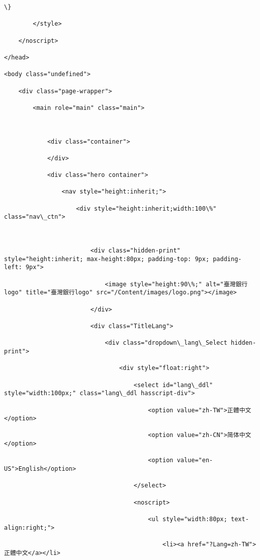 \documentclass[11pt]{article}
\begin{document}
\begin{Verbatim}[commandchars=\\\{\}]
            \}

        </style>

    </noscript>

</head>

<body class="undefined">

    <div class="page-wrapper">

        <main role="main" class="main">



            <div class="container">

            </div>

            <div class="hero container">

                <nav style="height:inherit;">

                    <div style="height:inherit;width:100\%" class="nav\_ctn">

                        

                        <div class="hidden-print" style="height:inherit; max-height:80px; padding-top: 9px; padding-left: 9px">

                            <image style="height:90\%;" alt="臺灣銀行logo" title="臺灣銀行logo" src="/Content/images/logo.png"></image>

                        </div>

                        <div class="TitleLang">

                            <div class="dropdown\_lang\_Select hidden-print">

                                <div style="float:right">

                                    <select id="lang\_ddl" style="width:100px;" class="lang\_ddl hasscript-div">

                                        <option value="zh-TW">正體中文</option>

                                        <option value="zh-CN">简体中文</option>

                                        <option value="en-US">English</option>

                                    </select>

                                    <noscript>

                                        <ul style="width:80px; text-align:right;">

                                            <li><a href="?Lang=zh-TW">正體中文</a></li>


\end{Verbatim}
\end{document}
